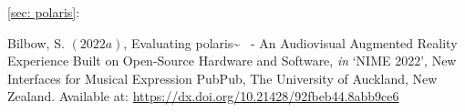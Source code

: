 \vspace*{0.75cm}
\noindent\autoref{sec: polaris}:  \\ \citep{bilbow2022}

\begin{hangparas}{.25in}{1}
	Bilbow, S. $(2022a)$, Evaluating polaris\textasciitilde{}~ - An Audiovisual Augmented Reality Experience Built on Open-Source Hardware and Software, \textit{in} `NIME 2022', New Interfaces for Musical Expression PubPub, The University of Auckland, New Zealand. Available at: \url{https://dx.doi.org/10.21428/92fbeb44.8abb9ce6}
\end{hangparas}